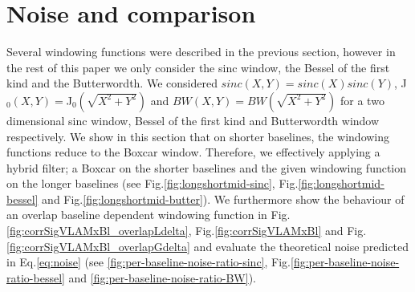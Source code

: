 \documentclass[useAMS,usenatbib]{mn2e}
\begin{document}
\section{Noise and comparison}
Several windowing functions  were described in the previous section, however in the rest of this paper we only consider the sinc 
window, the Bessel of the first kind and the Butterwordth.  We considered 
$sinc(X,Y)=sinc(X)sinc(Y)$, J$_0(X,Y)=$J$_0(\sqrt{X^2 + Y^2})$ and $BW(X,Y)=BW(\sqrt{X^2 + Y^2})$ for a two dimensional 
sinc window, Bessel of the first kind and Butterwordth window respectively. We show in this section that on shorter baselines, the 
windowing functions reduce to the Boxcar window. Therefore, we effectively applying a hybrid filter; a Boxcar on the shorter baselines and 
the given windowing function on the longer baselines (see Fig.\ref{fig:longshortmid-sinc}, Fig.\ref{fig:longshortmid-bessel} and 
Fig.\ref{fig:longshortmid-butter}). We furthermore show the behaviour of an overlap baseline dependent windowing function 
in Fig.\ref{fig:corrSigVLAMxBl_overlapLdelta}, Fig.\ref{fig:corrSigVLAMxBl} and Fig.\ref{fig:corrSigVLAMxBl_overlapGdelta} and evaluate the 
theoretical noise predicted in 
Eq.\ref{eq:noise} (see \ref{fig:per-baseline-noise-ratio-sinc}, Fig.\ref{fig:per-baseline-noise-ratio-bessel} 
and \ref{fig:per-baseline-noise-ratio-BW}).
\end{document}
